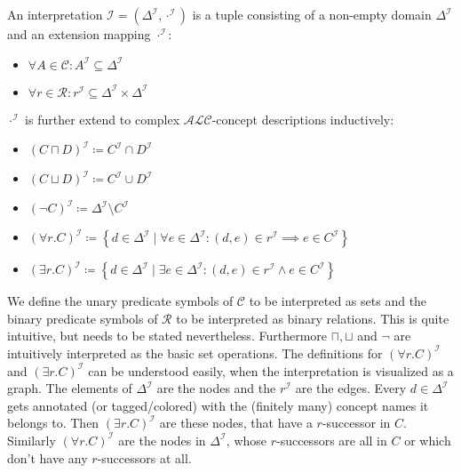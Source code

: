 \begin{definition}
	An interpretation $\mathcal{I} = (\Delta^{\mathcal{I}}, \cdot^{\mathcal{I}})$ is a tuple consisting of 
	a non-empty domain $\Delta^{\mathcal{I}}$ and
	an extension mapping $\cdot^{\mathcal{I}}$:
	\begin{itemize}
		\item $\forall A \in \mathscr{C}\mathrel{:} A^{\mathcal{I}} \subseteq \Delta^{\mathcal{I}}$
		\item $\forall r \in \mathscr{R} \mathrel{:} r^{\mathcal{I}}\subseteq \Delta^{\mathcal{I}} \times \Delta^{\mathcal{I}}$
	\end{itemize}
	$\cdot^{\mathcal{I}}$ is further extend to complex $\mathcal{ALC}$-concept descriptions inductively:
	\begin{itemize}
		\item $\left( C \sqcap D \right) ^{\mathcal{I}} \coloneqq C^{\mathcal{I}} \cap D^{\mathcal{I}}$
		\item $\left( C \sqcup D \right)^{\mathcal{I}} \coloneqq C^{\mathcal{I}} \cup D^{\mathcal{I}}$
		\item $\left( \neg C \right) ^{\mathcal{I}} \coloneqq \Delta ^{\mathcal{I}} \setminus C^{\mathcal{I}}$
		\item $\left( \forall r.C \right)^{\mathcal{I}} \coloneqq \left\{ d \in \Delta^{\mathcal{I}} \mid \forall e \in \Delta^{\mathcal{I}}\mathrel{:} (d,e) \in r^{\mathcal{I}} \implies e \in C^{\mathcal{I}} \right\} $
		\item $\left( \exists r.C \right)^{\mathcal{I}} \coloneqq \left\{ d \in \Delta^{\mathcal{I}} \mid \exists e \in \Delta^{\mathcal{I}}\mathrel{:} (d,e) \in r^{\mathcal{I}} \land e \in C^{\mathcal{I}} \right\} $
	\end{itemize}
\end{definition}
We define the unary predicate symbols of $\mathscr{C}$ to be interpreted as sets
and the binary predicate symbols of $\mathscr{R}$ to be interpreted as binary relations.
This is quite intuitive, but needs to be stated nevertheless.
Furthermore $\sqcap, \sqcup$ and $\neg$ are intuitively interpreted as the basic set operations.
The definitions for $\left( \forall r.C \right)^{\mathcal{I}}$ and $\left( \exists r.C \right)^{\mathcal{I}}$
can be understood easily, when the interpretation is visualized as a graph.
The elements of $\Delta^{\mathcal{I}}$ are the nodes and the $r^{\mathcal{I}}$ are the edges.
Every $d \in \Delta^{\mathcal{I}}$ gets annotated (or tagged/colored) with the (finitely many) concept names it belongs to.
Then $\left( \exists r.C \right)^{\mathcal{I}}$ are these nodes, that have a $r$-successor in $C$.
Similarly $\left( \forall r.C \right)^{\mathcal{I}}$ are the nodes in $\Delta^{\mathcal{I}}$, whose $r$-successors are all in $C$
or which don't have any $r$-successors at all.


